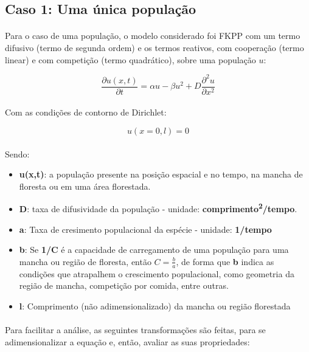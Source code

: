 \documentclass{article}
\begin{document}
	\subsection{Caso 1: Uma única população}
	
	\paragraph{}
	Para o caso de uma população, o modelo considerado foi FKPP com um termo difusivo (termo de segunda ordem) e os termos reativos, com cooperação (termo linear) e com competição (termo quadrático), sobre uma população $u$:
	
	$$ \frac{\partial u(x,t)}{\partial t} = \alpha u - \beta u^2 + D \frac{\partial^2 u}{\partial x^2}  $$
	
	\paragraph{}
	Com as condições de contorno de Dirichlet:
	
	$$u(x=0,l) = 0 $$
	
	\paragraph{}
	Sendo:
	
	\begin{itemize}
		\item \textbf{u(x,t)}: a população presente na posição espacial e no tempo, na mancha de floresta ou em uma área florestada.
		\item \textbf{D}: taxa de difusividade da população - unidade: \textbf{comprimento\textsuperscript{2}/tempo}.
		\item \textbf{a}: Taxa de cresimento populacional da espécie - unidade: \textbf{1/tempo}
		\item \textbf{b}: Se \textbf{1/C} é a capacidade de carregamento de uma população para uma mancha ou região de floresta, então $C=\frac{b}{a}$, de forma que \textbf{b} indica as condições que atrapalhem o crescimento populacional, como geometria da região de mancha, competição por comida, entre outras.
		\item \textbf{l}: Comprimento (não adimensionalizado) da mancha ou região florestada
	\end{itemize}
	
	\paragraph{}
	Para facilitar a análise, as seguintes transformações são feitas, para se adimensionalizar a equação e, então, avaliar as suas propriedades:
	
\end{document}
